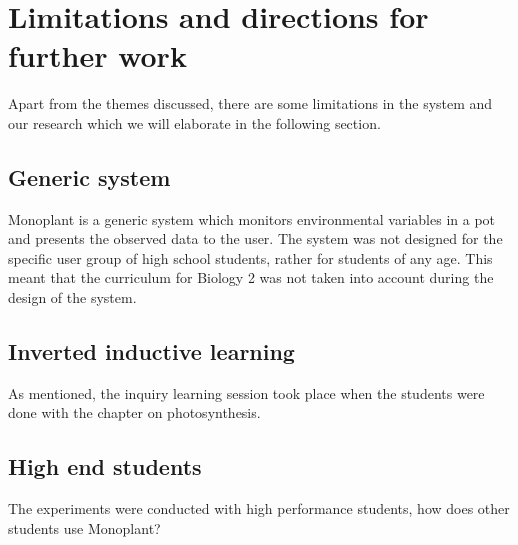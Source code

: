 \section{Limitations and directions for further work}
Apart from the themes discussed, there are some limitations in the system and our research which we will elaborate in the following section. 

\subsection{Generic system}
Monoplant is a generic system which monitors environmental variables in a pot and presents the observed data to the user. The system was not designed for the specific user group of high school students, rather for students of any age. This meant that the curriculum for Biology 2 was not taken into account during the design of the system. 


\subsection{Inverted inductive learning}
As mentioned, the inquiry learning session took place when the students were done with the chapter on photosynthesis. 

\subsection{High end students}
The experiments were conducted with high performance students, how does other students use Monoplant?
